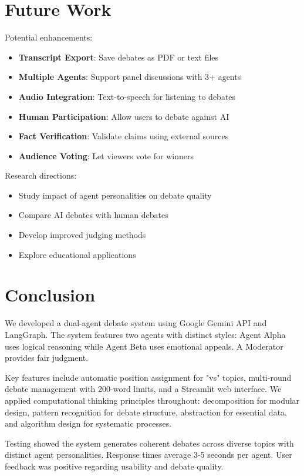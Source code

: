 \documentclass[conference]{IEEEtran}
\begin{document}
\section{Future Work}

Potential enhancements:
\begin{itemize}
\item \textbf{Transcript Export}: Save debates as PDF or text files
\item \textbf{Multiple Agents}: Support panel discussions with 3+ agents
\item \textbf{Audio Integration}: Text-to-speech for listening to debates
\item \textbf{Human Participation}: Allow users to debate against AI
\item \textbf{Fact Verification}: Validate claims using external sources
\item \textbf{Audience Voting}: Let viewers vote for winners
\end{itemize}

Research directions:
\begin{itemize}
\item Study impact of agent personalities on debate quality
\item Compare AI debates with human debates
\item Develop improved judging methods
\item Explore educational applications
\end{itemize}

\section{Conclusion}

We developed a dual-agent debate system using Google Gemini API and LangGraph. The system features two agents with distinct styles: Agent Alpha uses logical reasoning while Agent Beta uses emotional appeals. A Moderator provides fair judgment.

Key features include automatic position assignment for "vs" topics, multi-round debate management with 200-word limits, and a Streamlit web interface. We applied computational thinking principles throughout: decomposition for modular design, pattern recognition for debate structure, abstraction for essential data, and algorithm design for systematic processes.

Testing showed the system generates coherent debates across diverse topics with distinct agent personalities. Response times average 3-5 seconds per agent. User feedback was positive regarding usability and debate quality.
\end{document}
